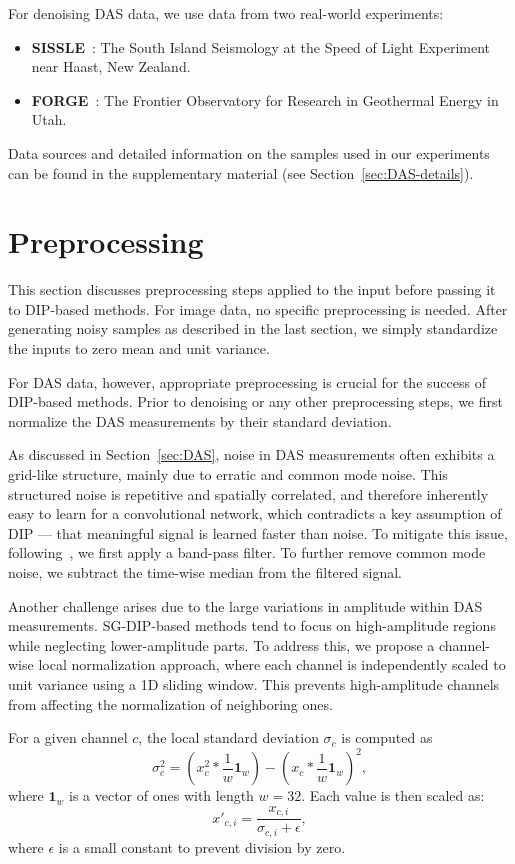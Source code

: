 For denoising DAS data, we use data from two real-world experiments:
\begin{itemize}
    \item \textbf{SISSLE}~\cite{SISSLE}: The South Island Seismology at the Speed of Light Experiment near Haast, New Zealand.
    \item \textbf{FORGE}~\cite{FORGE}: The Frontier Observatory for Research in Geothermal Energy in Utah.
\end{itemize}
Data sources and detailed information on the samples used in our experiments can be found in the supplementary material (see Section~\ref{sec:DAS-details}).

\section{Preprocessing}

This section discusses preprocessing steps applied to the input before passing it to DIP-based methods.
For image data, no specific preprocessing is needed.
After generating noisy samples as described in the last section, we simply standardize the inputs to zero mean and unit variance.

For DAS data, however, appropriate preprocessing is crucial for the success of DIP-based methods.
Prior to denoising or any other preprocessing steps, we first normalize the DAS measurements by their standard deviation.

As discussed in Section~\ref{sec:DAS}, noise in DAS measurements often exhibits a grid-like structure, mainly due to erratic and common mode noise.
This structured noise is repetitive and spatially correlated, and therefore inherently easy to learn for a convolutional network, which contradicts a key assumption of DIP --- that meaningful signal is learned faster than noise.
To mitigate this issue, following~\cite{IDF}, we first apply a band-pass filter.
To further remove common mode noise, we subtract the time-wise median from the filtered signal.

Another challenge arises due to the large variations in amplitude within DAS measurements.  
SG-DIP-based methods tend to focus on high-amplitude regions while neglecting lower-amplitude parts.  
To address this, we propose a channel-wise local normalization approach, where each channel is independently scaled to unit variance using a 1D sliding window.  
This prevents high-amplitude channels from affecting the normalization of neighboring ones.  

For a given channel $c$, the local standard deviation $\sigma_c$ is computed as
\begin{equation}
    \sigma_c^2 = \left( x_c^2 * \frac{1}{w} \mathbf{1}_w \right) - \left( x_c * \frac{1}{w} \mathbf{1}_w \right)^2,
\end{equation}
where $\mathbf{1}_w$ is a vector of ones with length $w=32$.
Each value is then scaled as:  
\begin{equation}
    x'_{c,i} = \frac{x_{c,i}}{\sigma_{c,i} + \epsilon},
\end{equation}
where $\epsilon$ is a small constant to prevent division by zero.


